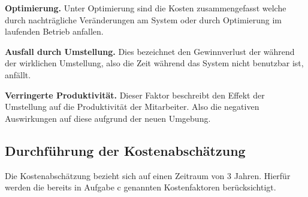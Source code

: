 \documentclass[12pt,utf8]{scrartcl}
\begin{document}
\textbf{Optimierung.} Unter Optimierung sind die Kosten zusammengefasst welche durch nachträgliche Veränderungen am System oder durch Optimierung im laufenden Betrieb anfallen.
\newline

\textbf{Ausfall durch Umstellung.} Dies bezeichnet den Gewinnverlust der während der wirklichen Umstellung, also die Zeit während das System nicht benutzbar ist, anfällt.
\newline

\textbf{Verringerte Produktivität.} Dieser Faktor beschreibt den Effekt der Umstellung auf die Produktivität der Mitarbeiter. Also die negativen Auswirkungen auf diese aufgrund der neuen Umgebung.
\newpage

\subsection*{Durchführung der Kostenabschätzung}

Die Kostenabschätzung bezieht sich auf einen Zeitraum von 3 Jahren. Hierfür werden die bereits in Aufgabe c genannten Kostenfaktoren berücksichtigt.
\end{document}
